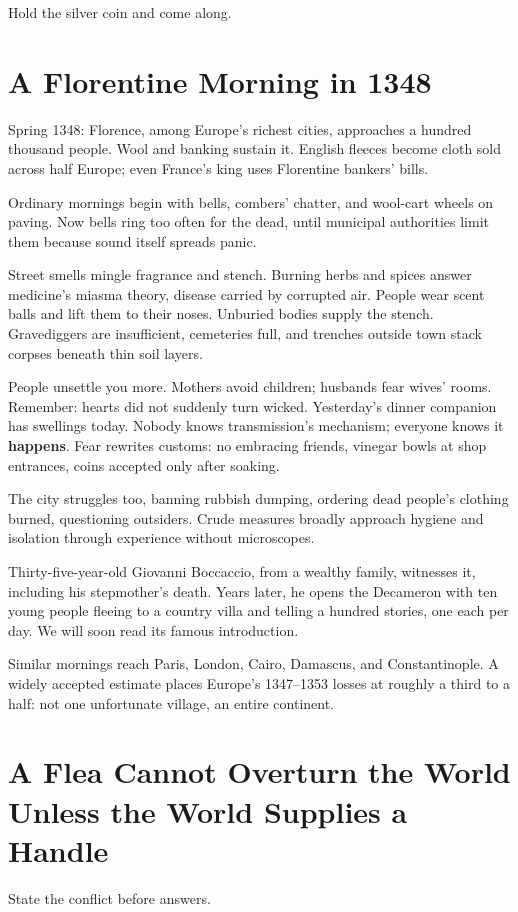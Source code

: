 Hold the silver coin and come along.

\section{A Florentine Morning in 1348}
Spring 1348: Florence, among Europe's richest cities, approaches a hundred thousand people. Wool and banking sustain it. English fleeces become cloth sold across half Europe; even France's king uses Florentine bankers' bills.

Ordinary mornings begin with bells, combers' chatter, and wool-cart wheels on paving. Now bells ring too often for the dead, until municipal authorities limit them because sound itself spreads panic.

Street smells mingle fragrance and stench. Burning herbs and spices answer medicine's miasma theory, disease carried by corrupted air. People wear scent balls and lift them to their noses. Unburied bodies supply the stench. Gravediggers are insufficient, cemeteries full, and trenches outside town stack corpses beneath thin soil layers.

People unsettle you more. Mothers avoid children; husbands fear wives' rooms. Remember: hearts did not suddenly turn wicked. Yesterday's dinner companion has swellings today. Nobody knows transmission's mechanism; everyone knows it \textbf{happens}. Fear rewrites customs: no embracing friends, vinegar bowls at shop entrances, coins accepted only after soaking.

The city struggles too, banning rubbish dumping, ordering dead people's clothing burned, questioning outsiders. Crude measures broadly approach hygiene and isolation through experience without microscopes.

Thirty-five-year-old Giovanni Boccaccio, from a wealthy family, witnesses it, including his stepmother's death. Years later, he opens the Decameron with ten young people fleeing to a country villa and telling a hundred stories, one each per day. We will soon read its famous introduction.

Similar mornings reach Paris, London, Cairo, Damascus, and Constantinople. A widely accepted estimate places Europe's 1347--1353 losses at roughly a third to a half: not one unfortunate village, an entire continent.

\section[A Flea Needs the World's Help]{A Flea Cannot Overturn the World Unless the World Supplies a Handle}
State the conflict before answers.

